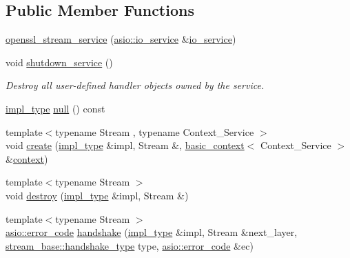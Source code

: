 \subsection*{Public Member Functions}
\begin{DoxyCompactItemize}
\item 
\hyperlink{classasio_1_1ssl_1_1old_1_1detail_1_1openssl__stream__service_ad0c4d0c6460ffa67912e54bc0cd3f599}{openssl\+\_\+stream\+\_\+service} (\hyperlink{classasio_1_1io__service}{asio\+::io\+\_\+service} \&\hyperlink{classasio_1_1io__service}{io\+\_\+service})
\item 
void \hyperlink{classasio_1_1ssl_1_1old_1_1detail_1_1openssl__stream__service_ae947b2f44d881c6765e4d058f4d0eb07}{shutdown\+\_\+service} ()
\begin{DoxyCompactList}\small\item\em Destroy all user-\/defined handler objects owned by the service. \end{DoxyCompactList}\item 
\hyperlink{classasio_1_1ssl_1_1old_1_1detail_1_1openssl__stream__service_a2419fd5a889197ed63b6d0bd14656027}{impl\+\_\+type} \hyperlink{classasio_1_1ssl_1_1old_1_1detail_1_1openssl__stream__service_ace79d56fa194297d1011194973a53b89}{null} () const 
\item 
{\footnotesize template$<$typename Stream , typename Context\+\_\+\+Service $>$ }\\void \hyperlink{classasio_1_1ssl_1_1old_1_1detail_1_1openssl__stream__service_a1e9eec6831be3f901f32c2f04d5bf3e4}{create} (\hyperlink{classasio_1_1ssl_1_1old_1_1detail_1_1openssl__stream__service_a2419fd5a889197ed63b6d0bd14656027}{impl\+\_\+type} \&impl, Stream \&, \hyperlink{classasio_1_1ssl_1_1old_1_1basic__context}{basic\+\_\+context}$<$ Context\+\_\+\+Service $>$ \&\hyperlink{classasio_1_1ssl_1_1context}{context})
\item 
{\footnotesize template$<$typename Stream $>$ }\\void \hyperlink{classasio_1_1ssl_1_1old_1_1detail_1_1openssl__stream__service_a36837af4af4dc52b99aed74f28d56cf6}{destroy} (\hyperlink{classasio_1_1ssl_1_1old_1_1detail_1_1openssl__stream__service_a2419fd5a889197ed63b6d0bd14656027}{impl\+\_\+type} \&impl, Stream \&)
\item 
{\footnotesize template$<$typename Stream $>$ }\\\hyperlink{classasio_1_1error__code}{asio\+::error\+\_\+code} \hyperlink{classasio_1_1ssl_1_1old_1_1detail_1_1openssl__stream__service_a23254006cbe4e28760b827c3b33894d3}{handshake} (\hyperlink{classasio_1_1ssl_1_1old_1_1detail_1_1openssl__stream__service_a2419fd5a889197ed63b6d0bd14656027}{impl\+\_\+type} \&impl, Stream \&next\+\_\+layer, \hyperlink{classasio_1_1ssl_1_1stream__base_a2f18813d3860bc8aee99249834d7c320}{stream\+\_\+base\+::handshake\+\_\+type} type, \hyperlink{classasio_1_1error__code}{asio\+::error\+\_\+code} \&ec)

\end{DoxyCompactItemize}

